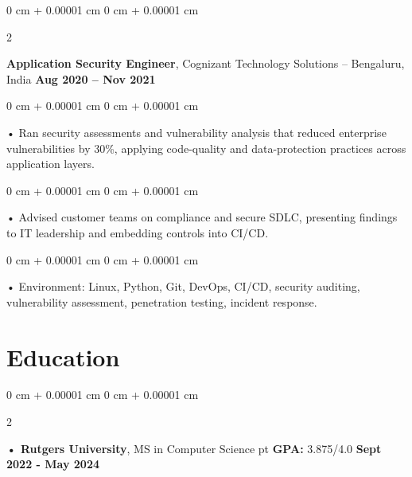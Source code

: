 \documentclass[10pt, letterpaper]{article}
\newenvironment{onecolentry}{
    \begin{adjustwidth}{
        0 cm + 0.00001 cm
    }{
        0 cm + 0.00001 cm
    }
}{
    \end{adjustwidth}
} %
\newenvironment{twocolentry}[2][]{
    \onecolentry
    \def\secondColumn{#2}
    \setcolumnwidth{\fill, 4.5 cm}
    \begin{paracol}{2}
}{
    \switchcolumn \raggedleft \secondColumn
    \end{paracol}
    \endonecolentry
} %
\begin{document}
        \begin{twocolentry}{
            \textbf{Aug 2020 – Nov 2021}
        }
            \vspace{2 pt }
            \textbf{Application Security Engineer}, Cognizant Technology Solutions -- Bengaluru, India\end{twocolentry}
        \begin{onecolentry}
             • Ran security assessments and vulnerability analysis that reduced enterprise vulnerabilities by 30\%, applying code-quality and data-protection practices across application layers.
        \end{onecolentry}
        \begin{onecolentry}
             • Advised customer teams on compliance and secure SDLC, presenting findings to IT leadership and embedding controls into CI/CD.
        \end{onecolentry}
        \begin{onecolentry}
             • Environment: Linux, Python, Git, DevOps, CI/CD, security auditing, vulnerability assessment, penetration testing, incident response.
        \end{onecolentry}
    \vspace{2 pt }
        \section{Education}
        \vspace{2 pt }
        \begin{twocolentry}{
            \textbf{Sept 2022 - May 2024}
        }
            \textbf{ • Rutgers University}, MS in Computer Science  pt \textbf{GPA:} 3.875/4.0  \end{twocolentry}
\end{document}
